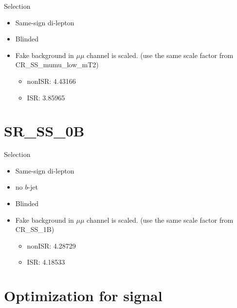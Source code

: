 \documentclass[mathserif,serif]{beamer}
\begin{document}
\begin{frame}{Selection}
\begin{itemize}
\item Same-sign di-lepton
\item Blinded
\item Fake background in $\mu\mu$ channel is scaled. (use the same scale factor from CR\_SS\_mumu\_low\_mT2)
\begin{itemize}
\item nonISR: 4.43166
\item ISR: 3.85965
\end{itemize}
\end{itemize}
\end{frame}

%
%

\section{SR\_SS\_0B}
\begin{frame}
\sectionpage
\end{frame}

\begin{frame}{Selection}
\begin{itemize}
\item Same-sign di-lepton
\item no $b$-jet
\item Blinded
\item Fake background in $\mu\mu$ channel is scaled. (use the same scale factor from CR\_SS\_1B)
\begin{itemize}
\item nonISR: 4.28729
\item ISR: 4.18533
\end{itemize}
\end{itemize}
\end{frame}

%
%

\section{Optimization for signal}
\begin{frame}
\sectionpage
\end{frame}

%
\end{document}
